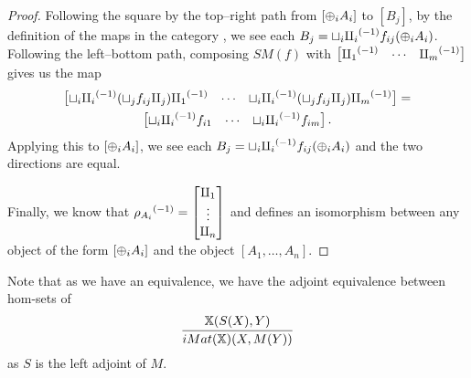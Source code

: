 \begin{proof}
  Following the square by the top--right path from $[\oplus_i A_i]$ to $[B_j]$, by the definition of
  the maps in the category \imatx, we see each $B_j = \sqcup_i{\amalg_{i}}^{(-1)} f_{ij}(\oplus_i A_i)$.
  Following the left--bottom path, composing $SM(f)$ with $\begin{bmatrix}{\amalg_{1}}^{(-1)}& \cdots
  &{\amalg_{m}}^{(-1)}\end{bmatrix}$ gives us the map
  \begin{multline*}
    \begin{bmatrix}\sqcup_i {\amalg_{i}}^{(-1)} (\sqcup_j f_{ij}\amalg_{j}){\amalg_{1}}^{(-1)}& \cdots
      &\sqcup_i {\amalg_{i}}^{(-1)} (\sqcup_j f_{ij}\amalg_{j}){\amalg_{m}}^{(-1)}\end{bmatrix} = \\
      \begin{bmatrix}\sqcup_i {\amalg_{i}}^{(-1)}  f_{i 1}& \cdots &\sqcup_i {\amalg_{i}}^{(-1)} f_{i m}\end{bmatrix}.
  \end{multline*}
  Applying this to $[\oplus_i A_i]$, we see each $B_j = \sqcup_i{\amalg_{i}}^{(-1)} f_{ij}(\oplus_i A_i)$ and the
  two directions are equal.

  Finally, we know that ${\rho_{A_i}}^{(-1)} = \begin{bmatrix}\amalg_{1}\\ \vdots \\\amalg_{n}\end{bmatrix}$
  and defines an isomorphism between any object of the form $[\oplus_i A_i]$ and the
  object $[A_1,\ldots,A_n]$.
\end{proof}

Note that as we have an equivalence, we have the adjoint equivalence between hom-sets of
\[
  \infer{iMat(\X)(X, M(Y))}{\X(S(X),Y)}
\]
as $S$ is the left adjoint of $M$.

